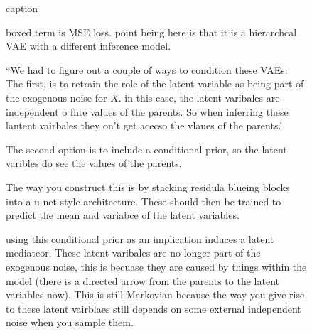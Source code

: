 \documentclass[11pt]{article}
\begin{document}
\begin{figure}[H]
    \centering
    \caption{caption}
\end{figure}

\begin{figure}[H]
    \centering
    \caption{boxed term is MSE loss. point being here is that it is a hierarchcal VAE with a different inference model.}
\end{figure}

\begin{figure}[H]
    \centering
    \caption{``We had to figure out a couple of ways to condition these VAEs. The first, is to retrain the role of the latent variable as being part of the exogenous noise for $X$. in this case, the latent varibales are independent o fhte values of the parents. So when inferring these lantent vairbales they on't get acecso the vlaues of the parents.'}
\end{figure}

\begin{figure}[H]
    \centering
    \caption{The second option is to include a conditional prior, so the latent varibles do see the values of the parents.}
\end{figure}

\begin{figure}[H]
    \centering
    \caption{The way you construct this is by stacking residula blueing blocks into a u-net style architecture. These should then be trained to predict the mean and variabce of the latent variables.}
\end{figure}

\begin{figure}[H]
    \centering
    \caption{using this conditional prior as an implication induces a latent mediateor. These latent varibales are no longer part of the exogenous noise, this is becuase they are caused by things within the model (there is a directed arrow from the parents to the latent variables now). This is still Markovian because the way you give rise to these latent vairblaes still depends on some external independent noise when you sample them.}
\end{figure}
\end{document}
